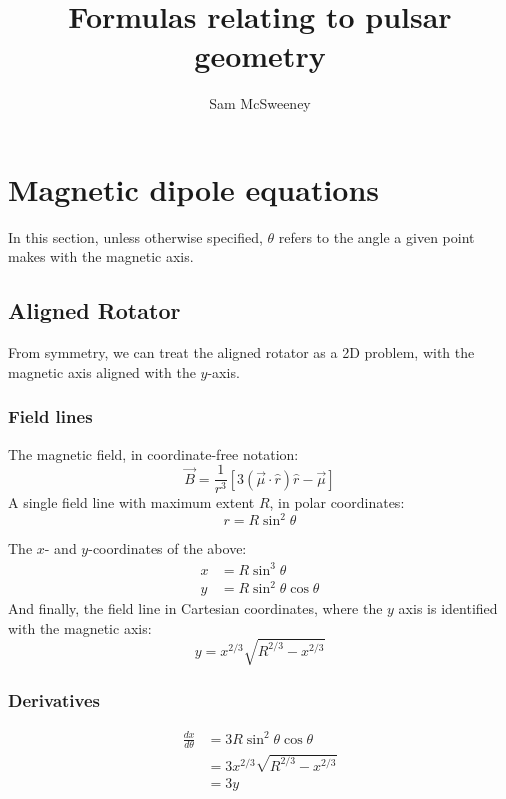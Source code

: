 \documentclass{article}
\title{Formulas relating to pulsar geometry}
\author{Sam McSweeney}
\newcommand{\deriv}[2]{\frac{d{#1}}{d{#2}}}
\begin{document}
\maketitle

\tableofcontents

\section{Magnetic dipole equations}

In this section, unless otherwise specified, $\theta$ refers to the angle a given point makes with the magnetic axis.

\subsection{Aligned Rotator}

From symmetry, we can treat the aligned rotator as a 2D problem, with the magnetic axis aligned with the $y$-axis.

\subsubsection{Field lines}

The magnetic field, in coordinate-free notation:
\begin{equation}
    \vec{B} = \frac{1}{r^3}\left[3(\vec{\mu}\cdot\hat{r})\hat{r} - \vec{\mu}\right]
\end{equation}
A single field line with maximum extent $R$, in polar coordinates:
\begin{equation}
    r = R\sin^2\theta
\end{equation}

The $x$- and $y$-coordinates of the above:
\begin{align}
    x &= R\sin^3\theta \\
    y &= R\sin^2\theta\cos\theta
\end{align}
And finally, the field line in Cartesian coordinates, where the $y$ axis is identified with the magnetic axis:
\begin{equation}
    y = x^{2/3} \sqrt{R^{2/3} - x^{2/3}}
\end{equation}

\subsubsection{Derivatives}

\begin{equation}
    \begin{aligned}
        \deriv{x}{\theta} &= 3R\sin^2\theta\cos\theta \\
          &= 3x^{2/3} \sqrt{R^{2/3} - x^{2/3}} \\
          &= 3y
    \end{aligned}
\end{equation}
\end{document}
